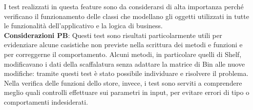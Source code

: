 \noindent I test realizzati in questa feature sono da considerarsi di alta importanza perché verificano il funzionamento delle classi che modellano gli oggetti utilizzati in tutte le funzionalità dell'applicativo e la logica di business.
\vspace{0.2cm} \\ \textbf{Considerazioni PB}: Questi test sono risultati particolarmente utili per evidenziare alcune casistiche non previste nella scrittura dei metodi e funzioni e per correggerne il comportamento. Alcuni metodi, in particolare quelli di Shelf, modificavano i dati della scaffalatura senza adattare la matrice di Bin alle nuove modifiche: tramite questi test è stato possibile individuare e risolvere il problema. Nella verifica delle funzioni dello store, invece, i test sono serviti a comprendere meglio quali controlli effettuare sui parametri in input, per evitare errori di tipo o comportamenti indesiderati.


